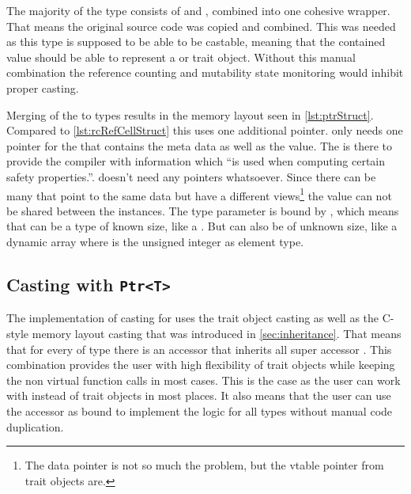 \documentclass[thesis]{subfiles}
\begin{document}
    The majority of the \PtrT type consists of \RcT and \RefCellT, combined into one cohesive wrapper.
    That means the original source code was copied and combined.
    This was needed as this type is supposed to be able to be castable, meaning that the contained value should be able to represent a \struct or trait object.
    Without this manual combination the reference counting and mutability state monitoring would inhibit proper casting.

    Merging of the to types results in the memory layout seen in \autoref{lst:ptrStruct}.
    Compared to \autoref{lst:rcRefCellStruct} this uses one additional pointer.
    \RcT only needs one pointer for the  that contains the meta data as well as the value.
    The  is there to provide the compiler with information which \enquote{is used when computing certain safety properties.}\autocite[std::marker::PhantomData]{rust-doc}.
    \RefCellT doesn't need any pointers whatsoever.
    Since there can be many \PtrTs that point to the same data but have a different views\footnote{
      The data pointer is not so much the problem, but the vtable pointer from trait objects are.
    } the value can not be shared between the \PtrT instances.
    The type parameter \T is bound by , which means that \T can be a type of known size, like a \struct.
    But \T can also be of unknown size, like a dynamic array \codr{[usize]} where  is the unsigned integer as element type\autocite[std::marker::Sized]{rust-doc}.

  \subsection{Casting with \texttt{Ptr<T>}}
    The implementation of casting for \PtrT uses the trait object casting as well as the C-style memory layout casting that was introduced in \autoref{sec:inheritance}.
    That means that for every \struct of type \T there is an accessor \trait that inherits all super accessor \traits.
    This combination provides the user with high flexibility of trait objects while keeping the non virtual function calls in most cases.
    This is the case as the user can work with \structs instead of trait objects in most places.
    It also means that the user can use the accessor \traits as bound to implement the logic for all types without manual code duplication.

\end{document}

